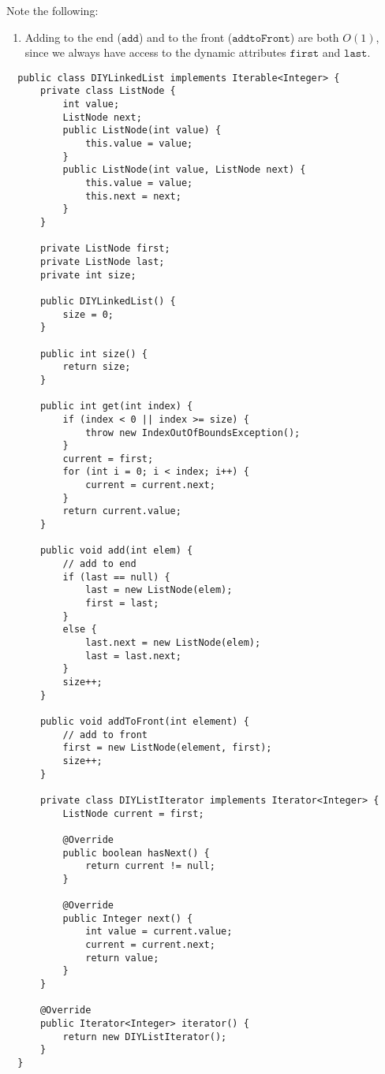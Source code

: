   \begin{definition}[DIYLinkedList]
  Note the following: 
  \begin{enumerate}
      \item Adding to the end ($\texttt{add}$) and to the front ($\texttt{addtoFront}$) are both $O(1)$, since we always have access to the dynamic attributes $\texttt{first}$ and $\texttt{last}$. 
  \end{enumerate}
  \begin{lstlisting}
  public class DIYLinkedList implements Iterable<Integer> {
      private class ListNode {
          int value; 
          ListNode next; 
          public ListNode(int value) {
              this.value = value; 
          }
          public ListNode(int value, ListNode next) {
              this.value = value; 
              this.next = next; 
          }
      }
      
      private ListNode first; 
      private ListNode last; 
      private int size; 
      
      public DIYLinkedList() {
          size = 0; 
      }
      
      public int size() {
          return size; 
      }
      
      public int get(int index) {
          if (index < 0 || index >= size) {
              throw new IndexOutOfBoundsException(); 
          }
          current = first; 
          for (int i = 0; i < index; i++) {
              current = current.next; 
          }
          return current.value; 
      }
      
      public void add(int elem) { 
          // add to end 
          if (last == null) {
              last = new ListNode(elem); 
              first = last; 
          }
          else {
              last.next = new ListNode(elem); 
              last = last.next; 
          }
          size++; 
      }
      
      public void addToFront(int element) {
          // add to front 
          first = new ListNode(element, first); 
          size++; 
      }
      
      private class DIYListIterator implements Iterator<Integer> {
          ListNode current = first; 
          
          @Override 
          public boolean hasNext() {
              return current != null; 
          }
          
          @Override 
          public Integer next() {
              int value = current.value; 
              current = current.next; 
              return value; 
          }
      }
      
      @Override
      public Iterator<Integer> iterator() {
          return new DIYListIterator(); 
      }
  }
  \end{lstlisting}
  \end{definition}


